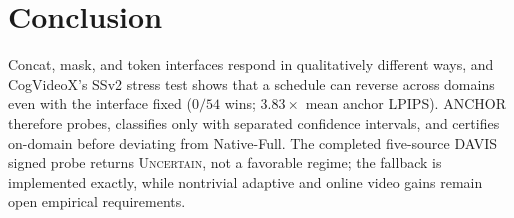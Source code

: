 \documentclass[letterpaper]{article}
\begin{document}
\section{Conclusion}
Concat, mask, and token interfaces respond in qualitatively different ways,
and CogVideoX's SSv2 stress test shows that a schedule can reverse across
domains even with the interface fixed ($0/54$ wins; $3.83\times$
mean anchor LPIPS). ANCHOR therefore probes, classifies only with separated
confidence intervals, and certifies on-domain before deviating from
Native-Full.
The completed five-source DAVIS signed probe returns \textsc{Uncertain}, not
a favorable regime; the fallback is implemented exactly, while nontrivial
adaptive and online video gains remain open empirical requirements.

\clearpage

\end{document}
